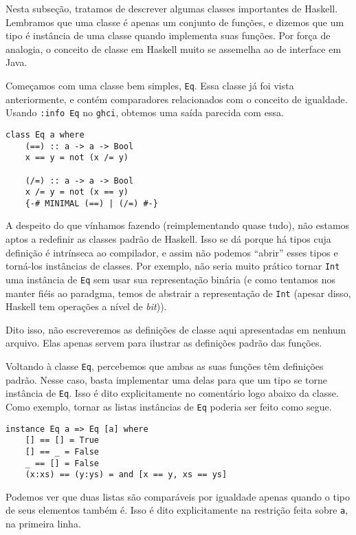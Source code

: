 \documentclass[a4paper]{article}
\begin{document}
Nesta subseção, tratamos de descrever algumas classes importantes de Haskell.
Lembramos que uma classe é apenas um conjunto de funções, e dizemos que um tipo é instância de uma classe quando implementa suas funções.
Por força de analogia, o conceito de classe em Haskell muito se assemelha ao de interface em Java.

Começamos com uma classe bem simples, \texttt{Eq}.
Essa classe já foi vista anteriormente, e contém comparadores relacionados com o conceito de igualdade.
Usando \texttt{:info Eq} no \texttt{ghci}, obtemos uma saída parecida com essa.

\begin{verbatim}
class Eq a where
	(==) :: a -> a -> Bool
	x == y = not (x /= y)
	
	(/=) :: a -> a -> Bool
	x /= y = not (x == y)
	{-# MINIMAL (==) | (/=) #-}
\end{verbatim}

A despeito do que vínhamos fazendo (reimplementando quase tudo), não estamos aptos a redefinir as classes padrão de Haskell.
Isso se dá porque há tipos cuja definição é intrínseca ao compilador, e assim não podemos ``abrir'' esses tipos e torná-los instâncias de classes.
Por exemplo, não seria muito prático tornar \texttt{Int} uma instância de \texttt{Eq} sem usar sua representação binária (e como tentamos nos manter fiéis ao paradgma, temos de abstrair a representação de \texttt{Int} (apesar disso, Haskell tem operações a nível de \emph{bit})).

Dito isso, não escreveremos as definições de classe aqui apresentadas em nenhum arquivo.
Elas apenas servem para ilustrar as definições padrão das funções.

Voltando à classe \texttt{Eq}, percebemos que ambas as suas funções têm definições padrão.
Nesse caso, basta implementar uma delas para que um tipo se torne instância de \texttt{Eq}.
Isso é dito explicitamente no comentário logo abaixo da classe.
Como exemplo, tornar as listas instâncias de \texttt{Eq} poderia ser feito como segue.

\begin{verbatim}
instance Eq a => Eq [a] where
	[] == [] = True
	[] == _ = False
	_ == [] = False
	(x:xs) == (y:ys) = and [x == y, xs == ys]
\end{verbatim}

Podemos ver que duas listas são comparáveis por igualdade apenas quando o tipo de seus elementos também é.
Isso é dito explicitamente na restrição feita sobre \texttt{a}, na primeira linha.
\end{document}
